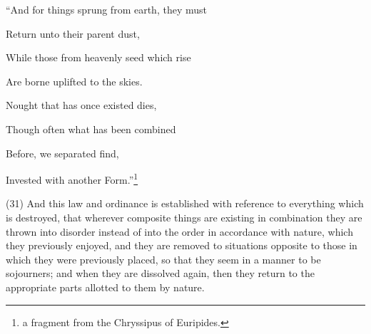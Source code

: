 ``And for things sprung from earth, they must

Return unto their parent dust,

While those from heavenly seed which rise

Are borne uplifted to the skies.

Nought that has once existed dies,

Though often what has been combined

Before, we separated find,

Invested with another Form.''\footnote{a fragment from the Chryssipus of Euripides.}

(31) And this law and ordinance is established with reference to everything which is destroyed, that
wherever composite things are existing in combination they are thrown into disorder instead of into
the order in accordance with nature, which they previously enjoyed, and they are removed to
situations opposite to those in which they were previously placed, so that they seem in a manner to
be sojourners; and when they are dissolved again, then they return to the appropriate parts allotted
to them by nature.

